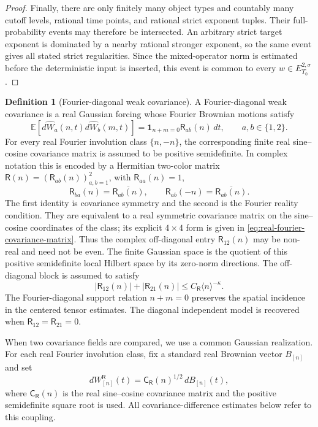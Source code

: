 \documentclass[10pt]{amsart}
\numberwithin{equation}{section}
\theoremstyle{plain}
\theoremstyle{definition}
\newtheorem{definition}[theorem]{Definition}
\theoremstyle{remark}
\newcommand{\E}{\mathbb{E}}
\begin{document}
\begin{proof}
Finally, there are only finitely many object types and countably many cutoff
levels, rational time points, and rational strict exponent tuples.  Their
full-probability events may therefore be intersected.  An arbitrary strict
target exponent is dominated by a nearby rational stronger exponent, so the
same event gives all stated strict regularities.  Since the mixed-operator
norm is estimated before the deterministic input is inserted, this event is
common to every $w\in E_{T_0}^{2,\sigma}$.
\end{proof}

\begin{definition}[Fourier-diagonal weak covariance]\label{def:wc-covariance}
A Fourier-diagonal weak covariance is a real Gaussian forcing whose Fourier Brownian motions satisfy
\begin{equation}\label{eq:wc-covariance-def-main}
        \E[d\widehat W_a(n,t)d\widehat W_b(m,t)]
        =\mathbf 1_{n+m=0}\mathsf R_{ab}(n)\,dt,
        \qquad a,b\in\{1,2\}.
\end{equation}
For every real Fourier involution class \(\{n,-n\}\), the corresponding finite real sine--cosine covariance matrix is assumed to be positive semidefinite.  In complex notation this is encoded by a Hermitian two-color matrix \(\mathsf R(n)=(\mathsf R_{ab}(n))_{a,b=1}^2\), with \(\mathsf R_{aa}(n)=1\),
\[
        \mathsf R_{ba}(n)=\overline{\mathsf R_{ab}(n)},
        \qquad
        \mathsf R_{ab}(-n)=\overline{\mathsf R_{ab}(n)}.
\]
The first identity is covariance symmetry and the second is the Fourier reality condition.  They are equivalent to a real symmetric covariance matrix on the sine--cosine coordinates of the class; its explicit $4\times4$ form is given in \eqref{eq:real-fourier-covariance-matrix}.  Thus the complex off-diagonal entry \(\mathsf R_{12}(n)\) may be non-real and need not be even.  The finite Gaussian space is the quotient of this positive semidefinite local Hilbert space by its zero-norm directions.  The off-diagonal block is assumed to satisfy
\begin{equation}\label{eq:wc-kappa-main}
        |\mathsf R_{12}(n)|+|\mathsf R_{21}(n)|
        \le C_{\mathsf R}\langle n\rangle^{-\kappa}.
\end{equation}
The Fourier-diagonal support relation \(n+m=0\) preserves the spatial incidence in the centered tensor estimates.  The diagonal independent model is recovered when \(\mathsf R_{12}=\mathsf R_{21}=0\).

When two covariance fields are compared, we use a common Gaussian realization.  For each real Fourier involution class, fix a standard real Brownian vector $B_{[n]}$ and set
\begin{equation}\label{eq:canonical-covariance-coupling}
        dW^{\mathsf R}_{[n]}(t)
        =\mathsf C_{\mathsf R}(n)^{1/2}\,dB_{[n]}(t),
\end{equation}
where \(\mathsf C_{\mathsf R}(n)\) is the real sine--cosine covariance matrix and the positive semidefinite square root is used.  All covariance-difference estimates below refer to this coupling.
\end{definition}
\end{document}
